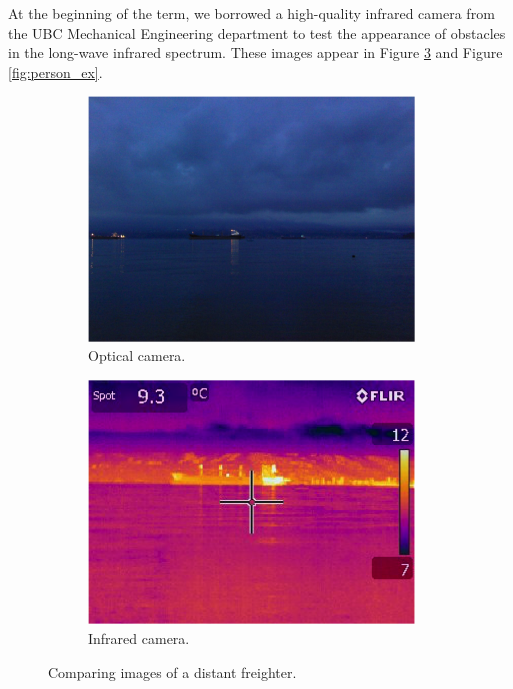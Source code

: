 At the beginning of the term, we borrowed a high-quality infrared camera from the UBC Mechanical Engineering department to test the appearance of obstacles in the long-wave infrared spectrum. These images appear in Figure \ref{fig:freighter_ex} and Figure \ref{fig:person_ex}.

\begin{figure}[h]
\centering
\begin{subfigure}{0.45\textwidth}
 \centering
 \includegraphics[width=0.95\textwidth]{"./image/freighter_normal"}
 \caption{Optical camera.}
 \label{fig:freighter_ex:sub1}
\end{subfigure}
\begin{subfigure}{0.45\textwidth}
 \centering
 \includegraphics[width=0.95\textwidth]{"./image/freighter_ir"}
 \caption{Infrared camera.}
 \label{fig:freighter_ex:sub2}
\end{subfigure}
\caption{Comparing images of a distant freighter.}
\label{fig:freighter_ex}
\end{figure}

